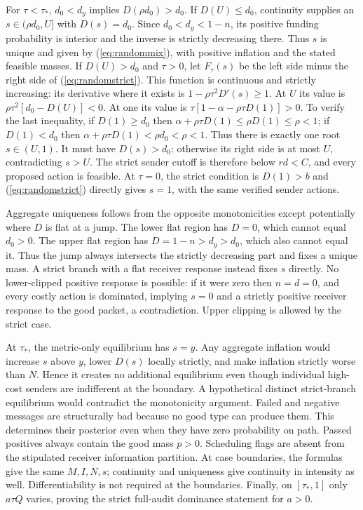 \documentclass[11pt]{article}
\begin{document}
For $\tau<\tau_*$, $d_0<d_y$ implies $D(\rho d_0)>d_0$. If $D(U)\leq d_0$, continuity supplies an $s\in(\rho d_0,U]$ with $D(s)=d_0$. Since $d_0<d_y<1-n$, its positive funding probability is interior and the inverse is strictly decreasing there. Thus $s$ is unique and given by (\ref{eq:randommix}), with positive inflation and the stated feasible masses. If $D(U)>d_0$ and $\tau>0$, let $F_\tau(s)$ be the left side minus the right side of (\ref{eq:randomstrict}). This function is continuous and strictly increasing: its derivative where it exists is $1-\rho\tau^2D'(s)\geq1$. At $U$ its value is $\rho\tau^2[d_0-D(U)]<0$. At one its value is $\tau[1-\alpha-\rho\tau D(1)]>0$. To verify the last inequality, if $D(1)\geq d_0$ then $\alpha+\rho\tau D(1)\leq\rho D(1)\leq\rho<1$; if $D(1)<d_0$ then $\alpha+\rho\tau D(1)<\rho d_0<\rho<1$. Thus there is exactly one root $s\in(U,1)$. It must have $D(s)>d_0$: otherwise its right side is at most $U$, contradicting $s>U$. The strict sender cutoff is therefore below $rd<C$, and every proposed action is feasible. At $\tau=0$, the strict condition is $D(1)>b$ and (\ref{eq:randomstrict}) directly gives $s=1$, with the same verified sender actions.

Aggregate uniqueness follows from the opposite monotonicities except potentially where $D$ is flat at a jump. The lower flat region has $D=0$, which cannot equal $d_0>0$. The upper flat region has $D=1-n>d_y>d_0$, which also cannot equal it. Thus the jump always intersects the strictly decreasing part and fixes a unique mass. A strict branch with a flat receiver response instead fixes $s$ directly. No lower-clipped positive response is possible: if it were zero then $n=d=0$, and every costly action is dominated, implying $s=0$ and a strictly positive receiver response to the good packet, a contradiction. Upper clipping is allowed by the strict case.

At $\tau_*$, the metric-only equilibrium has $s=y$. Any aggregate inflation would increase $s$ above $y$, lower $D(s)$ locally strictly, and make inflation strictly worse than $N$. Hence it creates no additional equilibrium even though individual high-cost senders are indifferent at the boundary. A hypothetical distinct strict-branch equilibrium would contradict the monotonicity argument. Failed and negative messages are structurally bad because no good type can produce them. This determines their posterior even when they have zero probability on path. Passed positives always contain the good mass $p>0$. Scheduling flags are absent from the stipulated receiver information partition. At case boundaries, the formulas give the same $M,I,N,s$; continuity and uniqueness give continuity in intensity as well. Differentiability is not required at the boundaries. Finally, on $[\tau_*,1]$ only $a\tau Q$ varies, proving the strict full-audit dominance statement for $a>0$.
\end{document}
